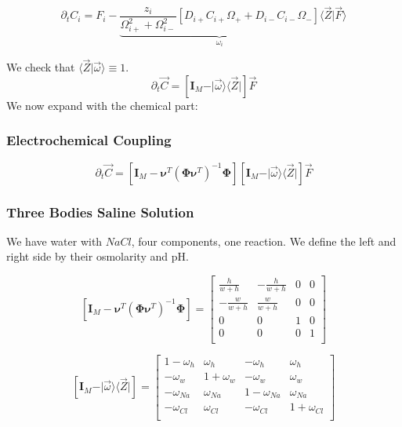 \documentclass[aps,12pt]{revtex4}
\begin{document}
\begin{equation}
	\partial_t C_i = F_i - \underbrace{\dfrac{z_i}{\Omega_{i+}^2 + \Omega_{i-}^2} \left[ D_{i+} C_{i+} \Omega_+ + D_{i-} C_{i-} \Omega_- \right]}_{\omega_i} \langle \vec Z \vert \vec F \rangle
\end{equation}

We check that $\langle \vec Z \vert \vec \omega \rangle \equiv 1$.
\begin{equation}
\boxed{
	\partial_t \vec C = \left[\bm I_M - \vert\vec \omega \rangle \langle \vec Z \vert \right] \vec F
	}
\end{equation}
We now expand with the chemical part:


\subsubsection{Electrochemical Coupling}

\begin{equation}
	\partial_t \vec C = \left[\bm{I}_M - \bm{\nu}^T (\bm \Phi \bm{\nu}^T) ^{-1} \bm \Phi \right] \left[\bm I_M - \vert\vec \omega \rangle \langle \vec Z \vert \right] \vec F
\end{equation}


\subsubsection{Three Bodies Saline Solution}

We have water with $NaCl$, four components, one reaction.
We define the left and right side by their osmolarity and pH.

\begin{equation}
\left[\bm{I}_M - \bm{\nu}^T (\bm \Phi \bm{\nu}^T) ^{-1} \bm \Phi \right]
=
\begin{bmatrix}
\frac{h}{w+h} & - \frac{h}{w+h} & 0 & 0\\
-\frac{w}{w+h} & \frac{w}{w+h}  & 0 & 0\\
0 & 0 & 1 & 0\\
0 & 0 & 0 & 1\\
\end{bmatrix}
\end{equation}

\begin{equation}
\left[\bm I_M - \vert\vec \omega \rangle \langle \vec Z \vert \right] =
\begin{bmatrix}
1-\omega_h & \omega_h & -\omega_h & \omega_h\\
-\omega_w  & 1+\omega_w & -\omega_w & \omega_w\\
-\omega_{Na}  & \omega_{Na} & 1-\omega_{Na} & \omega_{Na}\\
-\omega_{Cl}  & \omega_{Cl} & -\omega_{Cl} & 1+\omega_{Cl}\\
\end{bmatrix}
\end{equation}
\end{document}
